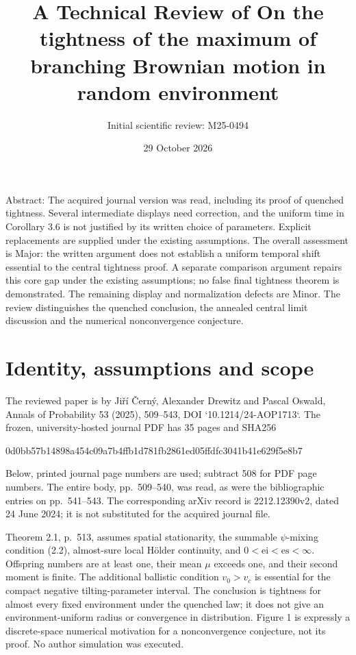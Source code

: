 \documentclass[10pt]{article}
\title{A Technical Review of
On the tightness of the maximum of branching Brownian motion in random environment}
\author{Initial scientific review: M25-0494}
\date{29 October 2026}
\begin{document}
\maketitle
Abstract: The acquired journal version was read, including its proof of quenched tightness. Several intermediate displays need correction, and the uniform time in Corollary 3.6 is not justified by its written choice of parameters. Explicit replacements are supplied under the existing assumptions. The overall assessment is Major: the written argument does not establish a uniform temporal shift essential to the central tightness proof. A separate comparison argument repairs this core gap under the existing assumptions; no false final tightness theorem is demonstrated. The remaining display and normalization defects are Minor. The review distinguishes the quenched conclusion, the annealed central limit discussion and the numerical nonconvergence conjecture.\par
\section*{Identity, assumptions and scope}
The reviewed paper is by Jiří Černý, Alexander Drewitz and Pascal Oswald, Annals of Probability 53 (2025), 509–543, DOI `10.1214/24-AOP1713`. The frozen, university-hosted journal PDF has 35 pages and SHA256\par
0d0bb57b14898a454c09a7b4ffb1d781fb2861ed05ffdfc3041b41e629f5e8b7\par
Below, printed journal page numbers are used; subtract 508 for PDF page numbers. The entire body, pp. 509–540, was read, as were the bibliographic entries on pp. 541–543. The corresponding arXiv record is 2212.12390v2, dated 24 June 2024; it is not substituted for the acquired journal file.\par
Theorem 2.1, p. 513, assumes spatial stationarity, the summable \(\psi\)-mixing condition (2.2), almost-sure local Hölder continuity, and \(0<\mathrm{ei}<\mathrm{es}<\infty\). Offspring numbers are at least one, their mean \(\mu\) exceeds one, and their second moment is finite. The additional ballistic condition \(v_0>v_c\) is essential for the compact negative tilting-parameter interval. The conclusion is tightness for almost every fixed environment under the quenched law; it does not give an environment-uniform radius or convergence in distribution. Figure 1 is expressly a discrete-space numerical motivation for a nonconvergence conjecture, not its proof. No author simulation was executed.\par
\end{document}
